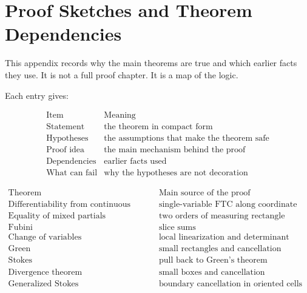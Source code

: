 
\chapter{Proof Sketches and Theorem Dependencies}
\label{app:proof-sketches}

This appendix records why the main theorems are true and which earlier facts they use.
It is not a full proof chapter.  It is a map of the logic.

Each entry gives:

\[
\begin{array}{c|l}
\text{Item} & \text{Meaning} \\ \hline
\text{Statement} & \text{the theorem in compact form}\\[1mm]
\text{Hypotheses} & \text{the assumptions that make the theorem safe}\\[1mm]
\text{Proof idea} & \text{the main mechanism behind the proof}\\[1mm]
\text{Dependencies} & \text{earlier facts used}\\[1mm]
\text{What can fail} & \text{why the hypotheses are not decoration}
\end{array}
\]

\[
\begin{array}{c|c}
\text{Theorem} & \text{Main source of the proof} \\ \hline
\text{Differentiability from continuous partials} & \text{single-variable FTC along coordinate steps}\\[1mm]
\text{Equality of mixed partials} & \text{two orders of measuring rectangle change}\\[1mm]
\text{Fubini} & \text{slice sums}\\[1mm]
\text{Change of variables} & \text{local linearization and determinant scaling}\\[1mm]
\text{Green} & \text{small rectangles and cancellation}\\[1mm]
\text{Stokes} & \text{pull back to Green's theorem}\\[1mm]
\text{Divergence theorem} & \text{small boxes and cancellation}\\[1mm]
\text{Generalized Stokes} & \text{boundary cancellation in oriented cells}
\end{array}
\]

